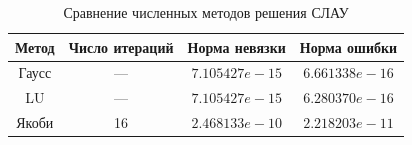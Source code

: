\begin{table}[H]
\centering
\caption{Сравнение численных методов решения СЛАУ}
\begin{tabular}{|c|c|c|c|}
\hline
Метод & Число итераций & Норма невязки & Норма ошибки \\
\hline
Гаусс & --- & $7.105427e-15$ & $6.661338e-16$ \\
LU & --- & $7.105427e-15$ & $6.280370e-16$ \\
Якоби & 16 & $2.468133e-10$ & $2.218203e-11$ \\
\hline
\end{tabular}
\end{table}